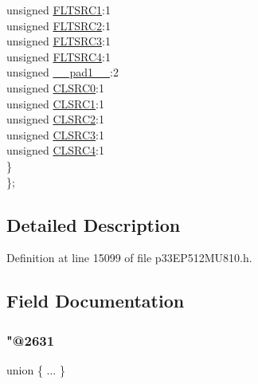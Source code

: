 \begin{DoxyCompactItemize}
\begin{tabbing}
\>\>unsigned \hyperlink{structtag_f_c_l_c_o_n5_b_i_t_s_a7e2dde44582a2b4411afb97f93704738}{FLTSRC1}:1\\
\>\>unsigned \hyperlink{structtag_f_c_l_c_o_n5_b_i_t_s_a41a56979130beaf62e52443409af0daf}{FLTSRC2}:1\\
\>\>unsigned \hyperlink{structtag_f_c_l_c_o_n5_b_i_t_s_a919f99b1241a5f4d92f40778ec6b91a8}{FLTSRC3}:1\\
\>\>unsigned \hyperlink{structtag_f_c_l_c_o_n5_b_i_t_s_afedaf58b1e4d19481bb47b44b59ecbc3}{FLTSRC4}:1\\
\>\>unsigned \hyperlink{structtag_f_c_l_c_o_n5_b_i_t_s_acaf2d0924a107ec6e8d2e31febaf66f9}{\_\_pad1\_\_}:2\\
\>\>unsigned \hyperlink{structtag_f_c_l_c_o_n5_b_i_t_s_a0a945873cb44d41b241b83b08b599880}{CLSRC0}:1\\
\>\>unsigned \hyperlink{structtag_f_c_l_c_o_n5_b_i_t_s_a59f38630bf59c0035792456d75d03410}{CLSRC1}:1\\
\>\>unsigned \hyperlink{structtag_f_c_l_c_o_n5_b_i_t_s_a24cd8f779980ba4b721ab1d0d63648de}{CLSRC2}:1\\
\>\>unsigned \hyperlink{structtag_f_c_l_c_o_n5_b_i_t_s_a86b531e28879dfb3db317ce2147d381e}{CLSRC3}:1\\
\>\>unsigned \hyperlink{structtag_f_c_l_c_o_n5_b_i_t_s_a438bb199cbcc62bfd380ead48036accc}{CLSRC4}:1\\
\>\} \\
\}; \\

\end{tabbing}\end{DoxyCompactItemize}


\subsection{Detailed Description}


Definition at line 15099 of file p33\+E\+P512\+M\+U810.\+h.



\subsection{Field Documentation}
\mbox{\label{structtag_f_c_l_c_o_n5_b_i_t_s_a9409cf0bd0c230a09b6ab97fc351c6f5}} 
\subsubsection{\texorpdfstring{"@2631}{@2631}}
{\footnotesize\ttfamily union \{ ... \} }

